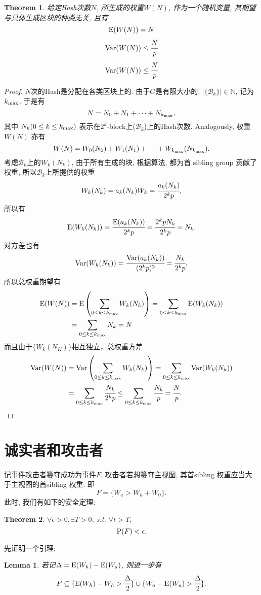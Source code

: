 \documentclass[UTF8]{ctexart}
\theoremstyle{definition}
\theoremstyle{plain}
\newtheorem{theorem}{Theorem}
\newtheorem{lemma}{Lemma}
\begin{document}
\begin{theorem}
    给定Hash次数$N$, 所生成的权重$W(N)$, 作为一个随机变量, 其期望与具体生成区块的种类无关, 且有
    \[ {\rm {E}}(W(N)) = N \]
    \[ {\rm {Var}}(W(N)) \leq \cfrac{N}{p}\]
    \[ {\rm {Var}}(W(N)) \leq \cfrac{N}{p}\]
    \label{weight}
\end{theorem}
\begin{proof}
    $N$次的Hash是分配在各类区块上的. 由于$G$是有限大小的, $|\{\mathcal{B}_k\}|\in \mathbb{N}$, 记为$k_{\rm max}$.
    于是有
    \[N = N_0 + N_1 + \dots + N_{k_{\rm max}},\] 其中 $N_k (0 \le k \le k_{\rm max})$ 表示在$2^k$-block上($\mathcal{B}_k$)上的Hash次数.
    Analogously, 权重$W(N)$ 亦有
    \[W(N) = W_0(N_0) + W_1(N_1) + \dots + W_{k_{\rm max}}(N_{k_{\rm max}}).\]
    考虑$\mathcal{B}_k$上的$W_k(N_k)$, 由于所有生成的块, 根据算法, 都为首 sibling group 贡献了权重, 所以$\mathcal{B}_k$上所提供的权重
    \[W_k(N_k) = a_k(N_k)W_k = \cfrac{a_k(N_k)}{2^k p},\]所以有
    \[{\rm E}(W_k(N_k))=\cfrac{{\rm E}(a_k(N_k))}{2^k p} = \cfrac{2^k p N_k}{2^k p} = N_k.\]
    对方差也有
    \[{\rm Var}(W_k(N_k))=\cfrac{{\rm Var}(a_k(N_k))}{(2^k p)^2} = \cfrac{N_k}{2^k p}.\]
    所以总权重期望有
    \begin{align*}
        {\rm {E}}(W(N)) &={\rm {E}}\left(\sum_{0 \le k \le k_{\rm max}} W_k(N_k)\right) =\sum_{0 \le k \le k_{\rm max}} {\rm {E}}(W_k(N_k))
        \\ &= \sum_{0 \le k \le k_{\rm max}}N_k = N
    \end{align*}
    而且由于$\{W_k(N_K)\}$相互独立，总权重方差
    \begin{align*}
        {\rm {Var}}(W(N)) &={\rm {Var}}\left(\sum_{0 \le k \le k_{\rm max}} W_k(N_k)\right) =\sum_{0 \le k \le k_{\rm max}} {\rm {Var}}(W_k(N_k))
        \\ &= \sum_{0 \le k \le k_{\rm max}}\cfrac{N_k}{2^k p} \leq \sum_{0 \le k \le k_{\rm max}}\cfrac{N_k}{p} = \cfrac{N}{p}.
    \end{align*}
\end{proof}

\section{诚实者和攻击者}
记事件攻击者篡夺成功为事件$F$. 攻击者若想篡夺主视图, 其首sibling 权重应当大于主视图的首sibling 权重. 
即\[F=\{W_a>W_h+W_0\}.\]
此时, 我们有如下的安全定理:
\begin{theorem}
    $\forall \epsilon>0, \exists T>0$, s.t. $\forall t>T$,
    \[{\rm P}(F) <\epsilon .\]
    \label{safethm}
\end{theorem}
先证明一个引理:
\begin{lemma}
    若记$\Delta = {\rm E}(W_h)-{\rm E}(W_a)$, 则进一步有
\[F\subseteq \{{\rm E}(W_h)-W_h>\cfrac{\Delta}{2}\} \cup \{W_a-{\rm E}(W_a)>\cfrac{\Delta}{2}\}.\]
\label{lem}
\end{lemma}
\end{document}
